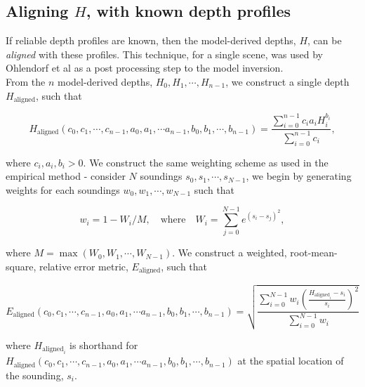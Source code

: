 \documentclass[12pt]{article}
\numberwithin{equation}{section}
\begin{document}
	\subsection{Aligning $H$, with known depth profiles}

If reliable depth profiles are known, then the model-derived depths, $H$, can be 
\textit{aligned} with these profiles. This technique, for a single scene, was used 
by Ohlendorf et al \cite[Figure 9. Depth validation at Rottnest 
Island, 2005]{ohlendorf2011} as a post processing step to the model inversion. \\

From the $n$ model-derived depths, $H_0, H_1, \cdots, H_{n-1}$, we construct a 
single depth $H_{\text{aligned}}$, such that 
\begin{linenomath}
\begin{equation*}
H_{\text{aligned}}(c_0, c_1, \cdots, c_{n-1}, a_0, a_1, \cdots a_{n-1}, b_0, b_1, \cdots, b_{n-1}) = \frac{\sum\limits_{i=0}^{n-1} c_i a_i H_i^{b_i}}{\sum\limits_{i=0}^{n-1}c_i},
\end{equation*}
\end{linenomath}
where $c_i,a_i,b_i > 0$. We construct the same weighting scheme as used in the empirical 
method - consider $N$ soundings $s_0, s_1, \cdots, s_{N-1}$, we begin by generating 
weights for each soundings $w_0, w_1, \cdots, w_{N-1}$ such that 
\begin{linenomath}
\begin{equation*}
w_i = 1 - W_i/M, \quad \text{where} \quad W_i = \sum\limits_{j=0}^{N-1} e^{\left(s_i - s_j\right)^2},
\end{equation*}
\end{linenomath}
where $M = \max(W_0, W_1, \cdots, W_{N-1})$. We construct a weighted, root-mean-square, 
relative error metric, $E_{\text{aligned}}$, such that 
\begin{linenomath}
\begin{equation*}
E_{\text{aligned}}(c_0, c_1, \cdots, c_{n-1}, a_0, a_1, \cdots a_{n-1}, b_0, b_1, \cdots, b_{n-1}) = 
\sqrt{\frac{\sum\limits_{i=0}^{N-1} w_i \left(\frac{H_{\text{aligned}_i} - s_i}{s_i}\right)^2}{\sum\limits_{i=0}^{N-1} w_i}}
\end{equation*}
\end{linenomath}
where $H_{\text{aligned}_i}$ is shorthand for $H_{\text{aligned}}(c_0, c_1, \cdots, c_{n-1}, a_0, a_1, \cdots a_{n-1}, b_0, b_1, \cdots, b_{n-1})$ at the spatial location of the sounding, $s_i$. \\  
\end{document}
